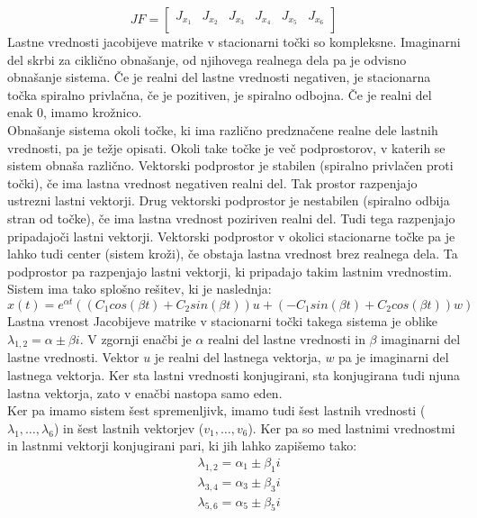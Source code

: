 \documentclass[a4paper, 12pt]{article}
\begin{document}
\begin{equation}
	JF =
	\begin{bmatrix}
		J_{x_{1}} & J_{x_{2}} & J_{x_{3}} & J_{x_{4}} & J_{x_{5}} & J_{x_{6}} \\
	\end{bmatrix}
\end{equation}
Lastne vrednosti jacobijeve matrike v stacionarni točki so kompleksne. Imaginarni del skrbi za ciklično obnašanje, od njihovega realnega dela pa
je odvisno obnašanje sistema. Če je realni del lastne vrednosti negativen, je stacionarna točka
spiralno privlačna, če je pozitiven, je spiralno odbojna. Če je realni del enak $ 0 $, imamo krožnico.\\
Obnašanje sistema okoli točke, ki ima različno predznačene realne dele lastnih vrednosti, pa je težje opisati. Okoli take točke je več podprostorov,
v katerih se sistem obnaša različno. Vektorski podprostor je stabilen (spiralno privlačen proti točki), če ima lastna vrednost negativen realni del.
Tak prostor razpenjajo ustrezni lastni vektorji. Drug vektorski podprostor je nestabilen (spiralno odbija stran od točke), če ima lastna vrednost poziriven
realni del. Tudi tega razpenjajo pripadajoči lastni vektorji. Vektorski podprostor v okolici stacionarne točke pa je lahko tudi center (sistem kroži), če obstaja
lastna vrednost brez realnega dela. Ta podprostor pa razpenjajo lastni vektorji, ki pripadajo takim lastnim vrednostim.\\
Sistem ima tako splošno rešitev, ki je naslednja:
\begin{equation}
	x(t) = e^{\alpha t}((C_{1}cos(\beta t)+C_{2}sin(\beta t))u+(-C_{1}sin(\beta t)+C_{2}cos(\beta t))w)
\end{equation}
Lastna vrenost Jacobijeve matrike v stacionarni točki takega sistema je oblike $ \lambda_{1,2} = \alpha \pm \beta i $.
V zgornji enačbi je $ \alpha $ realni del lastne vrednosti in $ \beta $ imaginarni del lastne vrednosti.
Vektor $ u $ je realni del lastnega vektorja, $ w $ pa je imaginarni del lastnega vektorja. Ker sta lastni
vrednosti konjugirani, sta konjugirana tudi njuna lastna vektorja, zato v enačbi nastopa samo eden.\\
Ker pa imamo sistem šest spremenljivk, imamo tudi šest lastnih vrednosti ($ \lambda_{1}, \dots, \lambda_{6} $) in šest lastnih vektorjev
($ v_{1}, \dots, v_{6} $). Ker pa so med lastnimi vrednostmi in lastnmi vektorji konjugirani pari, ki jih lahko zapišemo tako:
\begin{align*}
	&\lambda_{1,2} = \alpha_{1} \pm \beta_{1}i \\
	&\lambda_{3,4} = \alpha_{3} \pm \beta_{3}i \\
	&\lambda_{5,6} = \alpha_{5} \pm \beta_{5}i \\
\end{align*}
\end{document}
